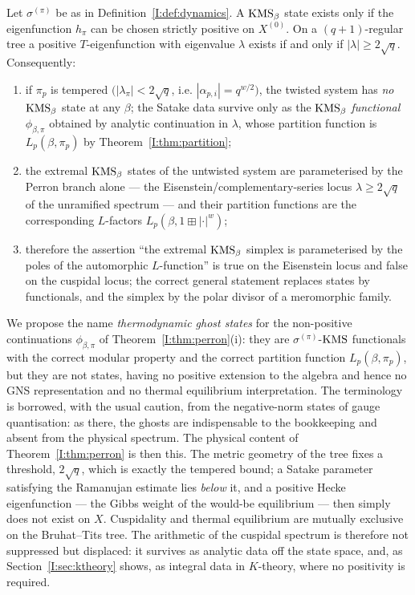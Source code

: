 \begin{theorem}\label{I:thm:perron}
Let $\sigma^{(\pi)}$ be as in Definition~\ref{I:def:dynamics}. A $\mathrm{KMS}_\beta$ state exists
only if the eigenfunction $h_\pi$ can be chosen strictly positive on $X^{(0)}$. On a
$(q+1)$-regular tree a positive $T$-eigenfunction with eigenvalue $\lambda$ exists if and
only if $|\lambda|\ge2\sqrt q$. Consequently:
\begin{enumerate}
\item[(i)] if $\pi_p$ is tempered $(|\lambda_\pi|<2\sqrt q$, i.e.
$|\alpha_{p,i}|=q^{w/2})$, the twisted system has \emph{no} $\mathrm{KMS}_\beta$ state at any
$\beta$; the Satake data survive only as the $\mathrm{KMS}_\beta$ \emph{functional}
$\phi_{\beta,\pi}$ obtained by analytic continuation in $\lambda$, whose partition
function is $L_p(\beta,\pi_p)$ by Theorem~\ref{I:thm:partition};
\item[(ii)] the extremal $\mathrm{KMS}_\beta$ states of the untwisted system are parameterised by
the Perron branch alone --- the Eisenstein/complementary-series locus
$\lambda\ge2\sqrt q$ of the unramified spectrum --- and their partition functions are the
corresponding $L$-factors $L_p(\beta,1\boxplus|\cdot|^{w})$;
\item[(iii)] therefore the assertion ``the extremal $\mathrm{KMS}_\beta$ simplex is
parameterised by the poles of the automorphic $L$-function'' is true on the Eisenstein
locus and false on the cuspidal locus; the correct general statement replaces states by
functionals, and the simplex by the polar divisor of a meromorphic family.
\end{enumerate}
\end{theorem}

\begin{remark}\label{I:rem:ghost}
We propose the name \emph{thermodynamic ghost states} for the non-positive continuations
$\phi_{\beta,\pi}$ of Theorem~\ref{I:thm:perron}(i): they are $\sigma^{(\pi)}$-$\mathrm{KMS}$
functionals with the correct modular property and the correct partition function
$L_p(\beta,\pi_p)$, but they are not states, having no positive extension to the algebra
and hence no GNS representation and no thermal equilibrium interpretation. The
terminology is borrowed, with the usual caution, from the negative-norm states of gauge
quantisation: as there, the ghosts are indispensable to the bookkeeping and absent from
the physical spectrum. The physical content of Theorem~\ref{I:thm:perron} is then this. The
metric geometry of the tree fixes a threshold, $2\sqrt q$, which is exactly the tempered
bound; a Satake parameter satisfying the Ramanujan estimate lies \emph{below} it, and a
positive Hecke eigenfunction --- the Gibbs weight of the would-be equilibrium --- then
simply does not exist on $X$. Cuspidality and thermal equilibrium are mutually exclusive
on the Bruhat--Tits tree. The arithmetic of the cuspidal spectrum is therefore not
suppressed but displaced: it survives as analytic data off the state space, and, as
Section~\ref{I:sec:ktheory} shows, as integral data in $K$-theory, where no positivity is
required.
\end{remark}

